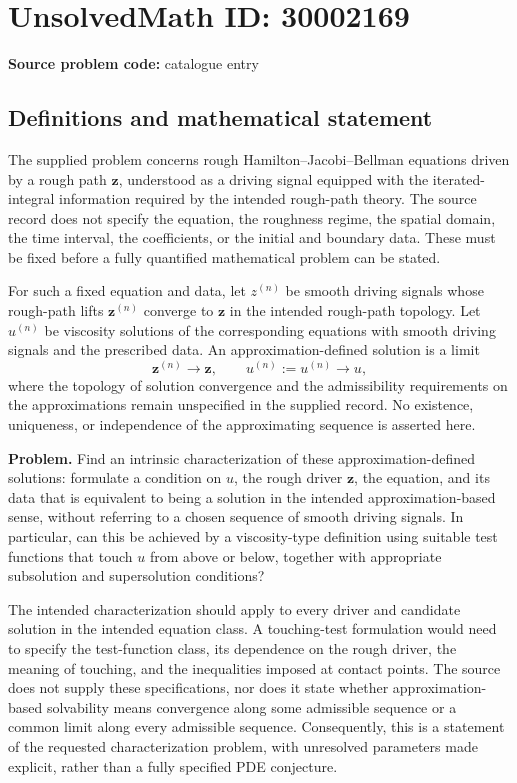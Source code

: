 \documentclass[11pt]{article}
\begin{document}
\section*{UnsolvedMath ID: 30002169}
\textbf{Source problem code:} catalogue entry
\subsection{Definitions and mathematical statement}
The supplied problem concerns rough Hamilton--Jacobi--Bellman equations driven by a rough path \(\mathbf z\), understood as a driving signal equipped with the iterated-integral information required by the intended rough-path theory. The source record does not specify the equation, the roughness regime, the spatial domain, the time interval, the coefficients, or the initial and boundary data. These must be fixed before a fully quantified mathematical problem can be stated.

For such a fixed equation and data, let \(z^{(n)}\) be smooth driving signals whose rough-path lifts \(\mathbf z^{(n)}\) converge to \(\mathbf z\) in the intended rough-path topology. Let \(u^{(n)}\) be viscosity solutions of the corresponding equations with smooth driving signals and the prescribed data. An approximation-defined solution is a limit
\[
\mathbf z^{(n)}\longrightarrow\mathbf z,
\qquad
u^{(n)}:=u^{(n)}\longrightarrow u,
\]
where the topology of solution convergence and the admissibility requirements on the approximations remain unspecified in the supplied record. No existence, uniqueness, or independence of the approximating sequence is asserted here.

\textbf{Problem.} Find an intrinsic characterization of these approximation-defined solutions: formulate a condition on \(u\), the rough driver \(\mathbf z\), the equation, and its data that is equivalent to being a solution in the intended approximation-based sense, without referring to a chosen sequence of smooth driving signals. In particular, can this be achieved by a viscosity-type definition using suitable test functions that touch \(u\) from above or below, together with appropriate subsolution and supersolution conditions?

The intended characterization should apply to every driver and candidate solution in the intended equation class. A touching-test formulation would need to specify the test-function class, its dependence on the rough driver, the meaning of touching, and the inequalities imposed at contact points. The source does not supply these specifications, nor does it state whether approximation-based solvability means convergence along some admissible sequence or a common limit along every admissible sequence. Consequently, this is a statement of the requested characterization problem, with unresolved parameters made explicit, rather than a fully specified PDE conjecture.
\end{document}

